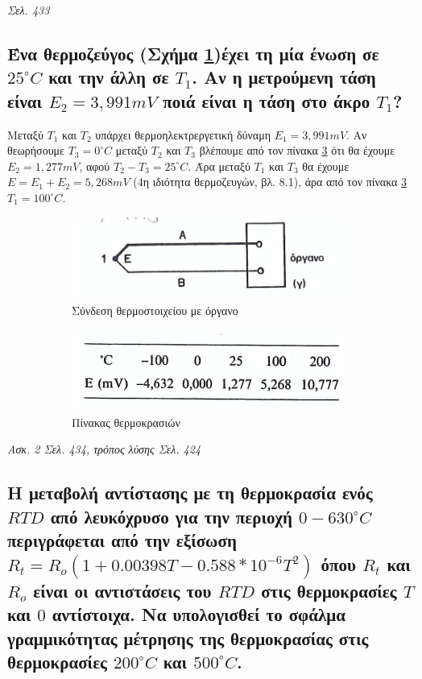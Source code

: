 \documentclass{article}
\begin{document}
\emph{Σελ. 433}

\subsection{Ένα θερμοζεύγος (Σχήμα \ref{thermikozevgos})έχει τη μία ένωση σε $25^{\circ} C$ και την άλλη σε $Τ_1$. Αν η μετρούμενη τάση είναι $E_2=3,991mV$ 
ποιά είναι η τάση στο άκρο $T_1$?}
Μεταξύ $Τ_1$ και $Τ_2$ υπάρχει θερμοηλεκτρεργετική δύναμη $Ε_1 = 3,991 mV$. Αν θεωρήσουμε $T_3 = 0^{\circ}C$ μεταξύ $T_2$ και $T_3$ βλέπουμε από τον πίνακα 
\ref{82pinakas} ότι θα έχουμε $E_2 = 1,277mV$, αφού $T_2 - T_3 = 25^{\circ}C$. Άρα μεταξύ $T_1$ και $T_3$ θα έχουμε $E = E_1 + E_2 = 5,268mV$ (4η ιδιότητα 
θερμοζευγών, βλ. 8.1), άρα από τον πίνακα \ref{82pinakas} $T_1 = 100^{\circ}C$.

\begin{figure}[h!]
    \centering
    \begin{subfigure}[b]{0.4\linewidth}
        \includegraphics[width=\linewidth]{thermikozevgos.png}
        \caption{Σύνδεση θερμοστοιχείου με όργανο}
        \label{thermikozevgos}
    \end{subfigure}
    \begin{subfigure}[b]{0.4\linewidth}
        \includegraphics[width=\linewidth]{82pinakas.png}
        \caption{Πίνακας θερμοκρασιών}
        \label{82pinakas}
    \end{subfigure}
    \caption{}
\end{figure}

\emph{Ασκ. 2 Σελ. 434, τρόπος λύσης Σελ. 424}

\subsection{Η μεταβολή αντίστασης με τη θερμοκρασία ενός $RTD$ από λευκόχρυσο για την περιοχή $0-630^{\circ}C$ περιγράφεται από την εξίσωση $R_t=R_o(1+0.00398T - 0.588*10^{-6}T^2)$
όπου $R_t$ και  $R_o$ είναι οι αντιστάσεις του $RTD$ στις θερμοκρασίες $Τ$ και $0$ αντίστοιχα. Να υπολογισθεί το σφάλμα γραμμικότητας μέτρησης της θερμοκρασίας στις θερμοκρασίες 
$200^{\circ}C$ και $500^{\circ}C$.}
\end{document}
